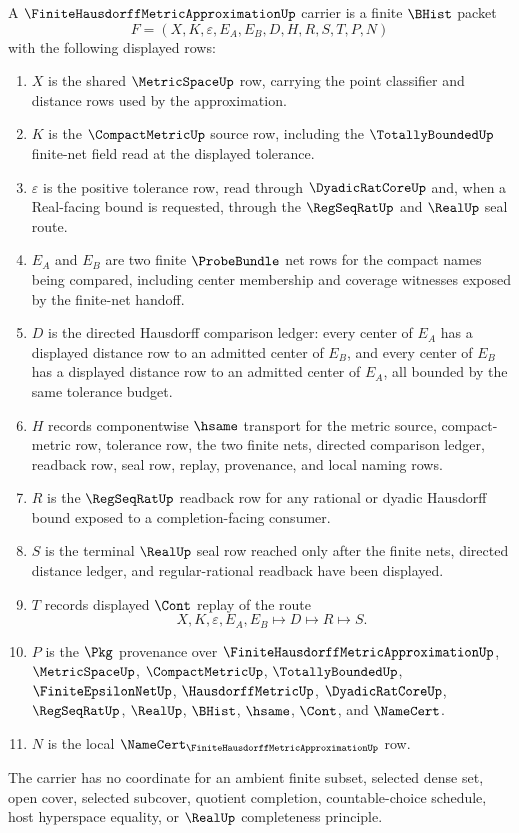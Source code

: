 \begin{definition}
\label{def:finite-hausdorff-metric-approximation-carrier}
A $\FiniteHausdorffMetricApproximationUp$ carrier is a finite $\BHist$ packet
$$
F=(X,K,\varepsilon,E_A,E_B,D,H,R,S,T,P,N)
$$
with the following displayed rows:
\begin{enumerate}
\item $X$ is the shared $\MetricSpaceUp$ row, carrying the point classifier and distance rows used by the approximation.
\item $K$ is the $\CompactMetricUp$ source row, including the $\TotallyBoundedUp$ finite-net field read at the displayed tolerance.
\item $\varepsilon$ is the positive tolerance row, read through $\DyadicRatCoreUp$ and, when a Real-facing bound is requested, through the $\RegSeqRatUp$ and $\RealUp$ seal route.
\item $E_A$ and $E_B$ are two finite $\ProbeBundle$ net rows for the compact names being compared, including center membership and coverage witnesses exposed by the finite-net handoff.
\item $D$ is the directed Hausdorff comparison ledger: every center of $E_A$ has a displayed distance row to an admitted center of $E_B$, and every center of $E_B$ has a displayed distance row to an admitted center of $E_A$, all bounded by the same tolerance budget.
\item $H$ records componentwise $\hsame$ transport for the metric source, compact-metric row, tolerance row, the two finite nets, directed comparison ledger, readback row, seal row, replay, provenance, and local naming rows.
\item $R$ is the $\RegSeqRatUp$ readback row for any rational or dyadic Hausdorff bound exposed to a completion-facing consumer.
\item $S$ is the terminal $\RealUp$ seal row reached only after the finite nets, directed distance ledger, and regular-rational readback have been displayed.
\item $T$ records displayed $\Cont$ replay of the route
$$
X,K,\varepsilon,E_A,E_B \longmapsto D \longmapsto R \longmapsto S .
$$
\item $P$ is the $\Pkg$ provenance over $\FiniteHausdorffMetricApproximationUp$, $\MetricSpaceUp$, $\CompactMetricUp$, $\TotallyBoundedUp$, $\FiniteEpsilonNetUp$, $\HausdorffMetricUp$, $\DyadicRatCoreUp$, $\RegSeqRatUp$, $\RealUp$, $\BHist$, $\hsame$, $\Cont$, and $\NameCert$.
\item $N$ is the local $\NameCert_{\FiniteHausdorffMetricApproximationUp}$ row.
\end{enumerate}
The carrier has no coordinate for an ambient finite subset, selected dense set, open cover, selected subcover, quotient completion, countable-choice schedule, host hyperspace equality, or $\RealUp$ completeness principle.
\end{definition}

